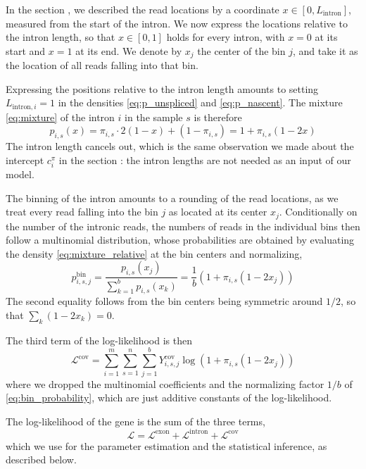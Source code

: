 \documentclass[11pt]{article}
\begin{document}
	In the section , we described the read locations by a coordinate $x \in [0, L_{\mathrm{intron}}]$, measured from the start of the intron. We now express the locations relative to the intron length, so that $x \in [0,1]$ holds for every intron, with $x = 0$ at its start and $x = 1$ at its end. We denote by $x_j$ the center of the bin $j$, and take it as the location of all reads falling into that bin.

	Expressing the positions relative to the intron length amounts to setting $L_{\mathrm{intron},i} = 1$ in the densities \eqref{eq:p_unspliced} and \eqref{eq:p_nascent}. The mixture \eqref{eq:mixture} of the intron $i$ in the sample $s$ is therefore
	\begin{equation} \label{eq:mixture_relative}
		p_{i,s}(x) = \pi_{i,s} \cdot 2 (1 - x) + (1 - \pi_{i,s}) = 1 + \pi_{i,s} (1 - 2x)
	\end{equation}
	The intron length cancels out, which is the same observation we made about the intercept $c^{\pi}_{i}$ in the section : the intron lengths are not needed as an input of our model.

	The binning of the intron amounts to a rounding of the read locations, as we treat every read falling into the bin $j$ as located at its center $x_j$. Conditionally on the number of the intronic reads, the numbers of reads in the individual bins then follow a multinomial distribution, whose probabilities are obtained by evaluating the density \eqref{eq:mixture_relative} at the bin centers and normalizing,
	\begin{equation} \label{eq:bin_probability}
		p^{\mathrm{bin}}_{i,s,j} = \frac{p_{i,s}(x_j)}{\sum_{k=1}^{b} p_{i,s}(x_k)} = \frac{1}{b} \left( 1 + \pi_{i,s} (1 - 2 x_j) \right)
	\end{equation}
	The second equality follows from the bin centers being symmetric around $1/2$, so that $\sum_{k} (1 - 2 x_k) = 0$.

	The third term of the log-likelihood is then
	\begin{equation} \label{eq:loglik_cov}
		\mathcal{L}^{\mathrm{cov}} = \sum_{i=1}^{m} \sum_{s=1}^{n} \sum_{j=1}^{b} Y^{\mathrm{cov}}_{i,s,j} \log \left( 1 + \pi_{i,s} (1 - 2 x_j) \right)
	\end{equation}
	where we dropped the multinomial coefficients and the normalizing factor $1/b$ of \eqref{eq:bin_probability}, which are just additive constants of the log-likelihood.

	The log-likelihood of the gene is the sum of the three terms,
	\begin{equation} \label{eq:loglik_total}
		\mathcal{L} = \mathcal{L}^{\mathrm{exon}} + \mathcal{L}^{\mathrm{intron}} + \mathcal{L}^{\mathrm{cov}}
	\end{equation}
	which we use for the parameter estimation and the statistical inference, as described below.
	
\end{document}
